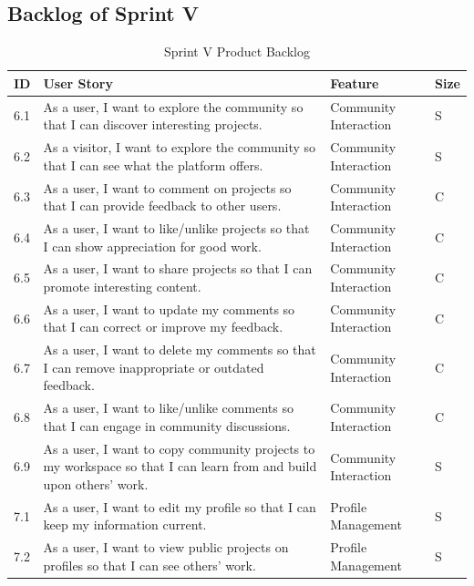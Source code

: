 \subsection{Backlog of Sprint V}

\begin{table}[H]
\centering
\caption{Sprint V Product Backlog}
\begin{tabular}{|p{1cm}|p{8cm}|p{1.5cm}|p{1cm}|}
\hline
\textbf{ID} & \textbf{User Story} & \textbf{Feature} & \textbf{Size} \\
\hline
6.1 & As a user, I want to explore the community so that I can discover interesting projects. & Community Interaction & S \\
\hline
6.2 & As a visitor, I want to explore the community so that I can see what the platform offers. & Community Interaction & S \\
\hline
6.3 & As a user, I want to comment on projects so that I can provide feedback to other users. & Community Interaction & C \\
\hline
6.4 & As a user, I want to like/unlike projects so that I can show appreciation for good work. & Community Interaction & C \\
\hline
6.5 & As a user, I want to share projects so that I can promote interesting content. & Community Interaction & C \\
\hline
6.6 & As a user, I want to update my comments so that I can correct or improve my feedback. & Community Interaction & C \\
\hline
6.7 & As a user, I want to delete my comments so that I can remove inappropriate or outdated feedback. & Community Interaction & C \\
\hline
6.8 & As a user, I want to like/unlike comments so that I can engage in community discussions. & Community Interaction & C \\
\hline
6.9 & As a user, I want to copy community projects to my workspace so that I can learn from and build upon others' work. & Community Interaction & S \\
\hline
7.1 & As a user, I want to edit my profile so that I can keep my information current. & Profile Management & S \\
\hline
7.2 & As a user, I want to view public projects on profiles so that I can see others' work. & Profile Management & S \\
\hline
\end{tabular}
\end{table}


